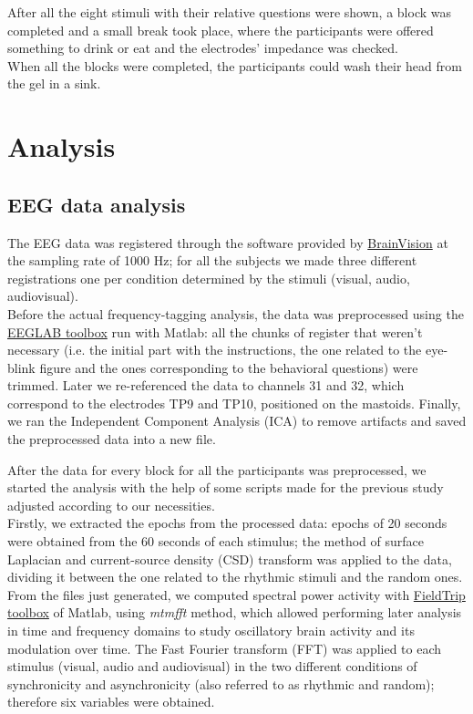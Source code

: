 After all the eight stimuli with their relative questions were shown, a block was completed and a small break took place, where the participants were offered something to drink or eat and the electrodes' impedance was checked. \\
When all the blocks were completed, the participants could wash their head from the gel in a sink.

\section{Analysis}
\subsection{EEG data analysis}
The EEG data was registered through the software provided by \href{https://brainvision.com/applications/brain-vision-software/}{BrainVision} at the sampling rate of 1000 Hz; for all the subjects we made three different registrations one per condition determined by the stimuli (visual, audio, audiovisual). \\
Before the actual frequency-tagging analysis, the data was preprocessed using the \href{https://eeglab.org/}{EEGLAB toolbox} run with Matlab: all the chunks of register that weren't necessary (i.e. the initial part with the instructions, the one related to the eye-blink figure and the ones corresponding to the behavioral questions) were trimmed. Later we re-referenced the data to channels 31 and 32, which correspond to the electrodes TP9 and TP10, positioned on the mastoids. Finally, we ran the Independent Component Analysis (ICA) to remove artifacts and saved the preprocessed data into a new file. 

After the data for every block for all the participants was preprocessed, we started the analysis with the help of some scripts made for the previous study adjusted according to our necessities. \\
Firstly, we extracted the epochs from the processed data: epochs of 20 seconds were obtained from the 60 seconds of each stimulus; the method of surface Laplacian and current-source density (CSD) transform was applied to the data, dividing it between the one related to the rhythmic stimuli and the random ones. \\
From the files just generated, we computed spectral power activity with \href{https://www.fieldtriptoolbox.org/}{FieldTrip toolbox} of Matlab, using \textit{mtmfft} method, which allowed performing later analysis in time and frequency domains to study oscillatory brain activity and its modulation over time. The Fast Fourier transform (FFT) was applied to each stimulus (visual, audio and audiovisual) in the two different conditions of synchronicity and asynchronicity (also referred to as rhythmic and random); therefore six variables were obtained. 

